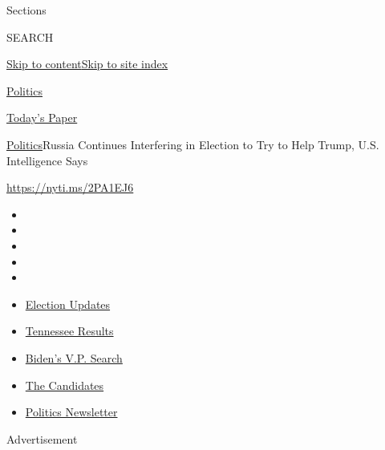 Sections

SEARCH

\protect\hyperlink{site-content}{Skip to
content}\protect\hyperlink{site-index}{Skip to site index}

\href{https://www.nytimes.com/section/politics}{Politics}

\href{https://myaccount.nytimes.com/auth/login?response_type=cookie\&client_id=vi}{}

\href{https://www.nytimes.com/section/todayspaper}{Today's Paper}

\href{/section/politics}{Politics}\textbar{}Russia Continues Interfering
in Election to Try to Help Trump, U.S. Intelligence Says

\href{https://nyti.ms/2PA1EJ6}{https://nyti.ms/2PA1EJ6}

\begin{itemize}
\item
\item
\item
\item
\item
\end{itemize}

\begin{itemize}
\item
  \href{https://www.nytimes.com/2020/08/07/us/elections/biden-vs-trump.html?action=click\&pgtype=Article\&state=default\&region=TOP_BANNER\&context=storylines_menu}{Election
  Updates}
\item
  \href{https://www.nytimes.com/interactive/2020/08/06/us/elections/results-tennessee-primary-elections.html?action=click\&pgtype=Article\&state=default\&region=TOP_BANNER\&context=storylines_menu}{Tennessee
  Results}
\item
  \href{https://www.nytimes.com/article/biden-vice-president-2020.html?action=click\&pgtype=Article\&state=default\&region=TOP_BANNER\&context=storylines_menu}{Biden's
  V.P. Search}
\item
  \href{https://www.nytimes.com/interactive/2019/us/politics/2020-presidential-candidates.html?action=click\&pgtype=Article\&state=default\&region=TOP_BANNER\&context=storylines_menu}{The
  Candidates}
\item
  \href{https://www.nytimes.com/newsletters/politics?action=click\&pgtype=Article\&state=default\&region=TOP_BANNER\&context=storylines_menu}{Politics
  Newsletter}
\end{itemize}

Advertisement

